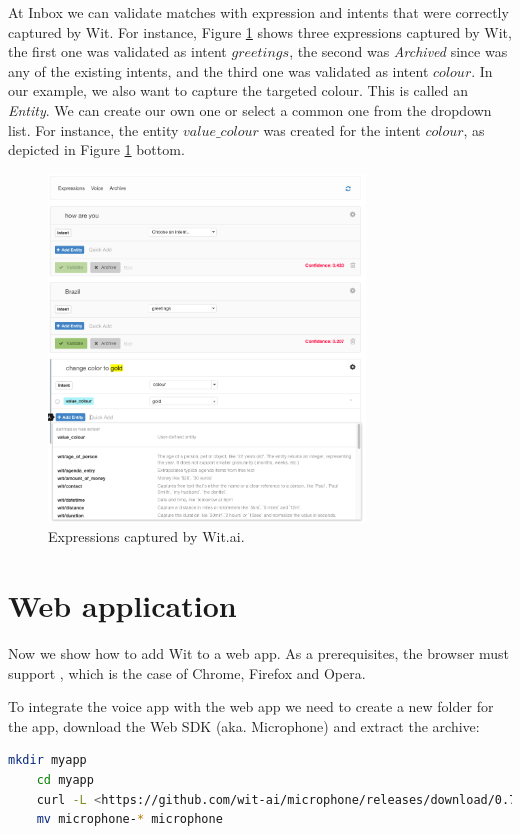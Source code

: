 \documentclass[twoside,11pt]{article}
\begin{document}
At Inbox we can validate matches with expression and intents that were correctly captured by Wit.
For instance, Figure \ref{fig:expressions} shows three expressions captured by Wit, the first one was validated as intent $greetings$, the second was \emph{Archived} since was any of the existing intents, and the third one was validated as intent $colour$.
In our example, we also want to capture the targeted colour.
This is called an \emph{Entity}. 
We can create our own one or select a common one from the dropdown list. 
For instance, the entity $value\_colour$ was created for the intent $colour$, as depicted in Figure \ref{fig:expressions} bottom.


\begin{figure}[!h]
\begin{center}
    \includegraphics[width=0.75\textwidth]{figures/expressions.png}
    \caption{Expressions captured by Wit.ai.}
    \label{fig:expressions}
\end{center}
\end{figure}

\section{Web application}
\label{sec:web}

Now we show how to add Wit to a web app.
As a prerequisites, the browser must support \cite{webrtc}, which is the case of Chrome, Firefox and Opera.

To integrate the voice app with the web app we need to create a new folder for the app, download the Web SDK (aka. Microphone) and extract the archive:
\begin{lstlisting}[language=bash]
	mkdir myapp
	cd myapp
	curl -L <https://github.com/wit-ai/microphone/releases/download/0.7.0/microphone-0.7.0.tar.gz | tar xvzf -
	mv microphone-* microphone
\end{lstlisting}
\end{document}
